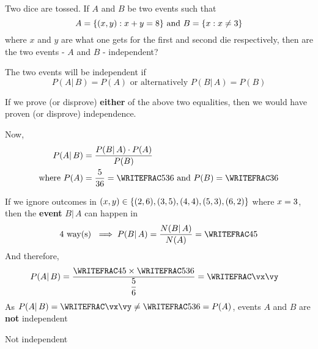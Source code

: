 


\question[4] Two dice are tossed. If $A$ and $B$ be two events such that
\[ A = \lbrace(x,y) : x + y = 8\rbrace\text{ and } B = \lbrace x : x\neq3\rbrace \]
where $x$ and $y$ are what one gets for the first and second die respectively, 
then are the two events - $A$ and $B$ - independent?

\watchout


\FRACMULT{}\ve\vd\vm\vn
\FRACDIV\vm{}\vx\vy

\begin{solution}[\halfpage]
  The two events will be independent if 
  \[ P(A\vert\, B) = P(A)\text{ or alternatively } P(B\vert\, A) = P(B) \] 

  If we prove (or disprove) \textbf{either} of the above two equalities, then 
  we would have proven (or disprove) independence. 

  Now,
	\begin{align}
  	  P(A\vert\,B) &= \dfrac{P(B\vert\,A)\cdot P(A)}{P(B)} \\
      \text{where } P(A) &= \dfrac\vd{36} = \WRITEFRAC\vd{36}\text{ and } P(B) = \WRITEFRAC\vb{6}
   \end{align}

  	If we ignore outcomes in $(x,y)\in\lbrace(2,6),(3,5),(4,4),(5,3),(6,2)\rbrace$ where $x=3$, then the \textbf{event} $B\vert\, A$ 
    can happen in 
      \[ \ve\text{ way(s) }\implies P(B\vert\, A) = \dfrac{N(B\vert\, A)}{N(A)} = \WRITEFRAC\ve\vd \] 
  	And therefore, 
    \begin{align}
  		P(A\vert\, B) &= \dfrac{\WRITEFRAC\ve\vd\times\WRITEFRAC\vd{36}}{\dfrac{5}{6}} = \WRITEFRAC\vx\vy
  	\end{align}
  	As $P(A\vert\,B) = \WRITEFRAC\vx\vy\neq \WRITEFRAC\vd{36} = P(A)$, 
  	events $A$ and $B$ are \textbf{not} independent
\end{solution}

\ifprintanswers\begin{codex}Not independent\end{codex}\fi
